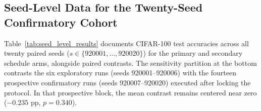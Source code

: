 \documentclass[sn-mathphys,Numbered]{sn-jnl}
\begin{document}
\begin{appendices}

\section{Seed-Level Data for the Twenty-Seed Confirmatory Cohort}\label{sec:appendix_twenty_seeds}

Table~\ref{tab:seed_level_results} documents CIFAR-100 test accuracies across all twenty paired seeds ($s \in \{920001, \dots, 920020\}$) for the primary and secondary schedule arms, alongside paired contrasts. The sensitivity partition at the bottom contrasts the six exploratory runs (seeds 920001--920006) with the fourteen prospective confirmatory runs (seeds 920007--920020) executed after locking the protocol. In that prospective block, the mean contrast remains centered near zero ($-0.235$ pp, $p = 0.340$).


\end{appendices}
\end{document}
